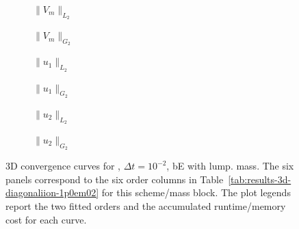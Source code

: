 \begin{figure}[p]
\centering
\begin{subfigure}{0.485\linewidth}
\centering
{}
\caption{$\|V_m\|_{L_2}$}
\label{fig:results-3d-diagonaliion-1p0em02-backwardeuler-lumped-a}
\end{subfigure}
\hfill
\begin{subfigure}{0.485\linewidth}
\centering
{}
\caption{$\|V_m\|_{G_2}$}
\label{fig:results-3d-diagonaliion-1p0em02-backwardeuler-lumped-b}
\end{subfigure}
\par\vspace{0.8em}
\begin{subfigure}{0.485\linewidth}
\centering
{}
\caption{$\|u_1\|_{L_2}$}
\label{fig:results-3d-diagonaliion-1p0em02-backwardeuler-lumped-c}
\end{subfigure}
\hfill
\begin{subfigure}{0.485\linewidth}
\centering
{}
\caption{$\|u_1\|_{G_2}$}
\label{fig:results-3d-diagonaliion-1p0em02-backwardeuler-lumped-d}
\end{subfigure}
\par\vspace{0.8em}
\begin{subfigure}{0.485\linewidth}
\centering
{}
\caption{$\|u_2\|_{L_2}$}
\label{fig:results-3d-diagonaliion-1p0em02-backwardeuler-lumped-e}
\end{subfigure}
\hfill
\begin{subfigure}{0.485\linewidth}
\centering
{}
\caption{$\|u_2\|_{G_2}$}
\label{fig:results-3d-diagonaliion-1p0em02-backwardeuler-lumped-f}
\end{subfigure}
\caption{3D convergence curves for , $\Delta t=10^{-2}$, bE with lump. mass. The six panels correspond to the six order columns in Table~\ref{tab:results-3d-diagonaliion-1p0em02} for this scheme/mass block. The plot legends report the two fitted orders and the accumulated runtime/memory cost for each curve.}
\label{fig:results-3d-diagonaliion-1p0em02-backwardeuler-lumped}
\end{figure}
\FloatBarrier

